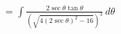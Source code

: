 \documentclass[preview]{standalone}
\begin{document}
\begin{align*}
&= \int \frac{2\sec\theta\tan\theta}{(\sqrt{4(2\sec\theta)^2-16})^3} \, d\theta \\
\end{align*}
\end{document}
